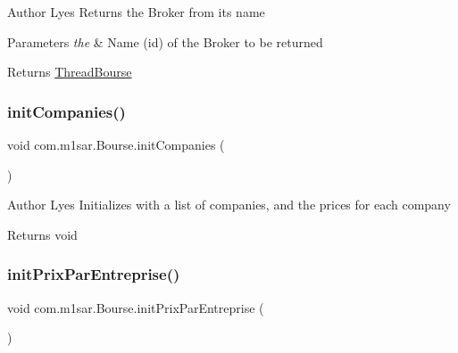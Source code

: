 \begin{DoxyAuthor}{Author}
Lyes Returns the Broker from its name 
\end{DoxyAuthor}

\begin{DoxyParams}{Parameters}
{\em the} & Name (id) of the Broker to be returned \\
\hline
\end{DoxyParams}
\begin{DoxyReturn}{Returns}
{\ttfamily \hyperlink{classcom_1_1m1sar_1_1_thread_bourse}{Thread\+Bourse}} 
\end{DoxyReturn}
\mbox{\label{classcom_1_1m1sar_1_1_bourse_a735c9da562fa5e84f2cc50cfed378bd9}} 
\subsubsection{\texorpdfstring{init\+Companies()}{initCompanies()}}
{\footnotesize\ttfamily void com.\+m1sar.\+Bourse.\+init\+Companies (\begin{DoxyParamCaption}{ }\end{DoxyParamCaption})}

\begin{DoxyAuthor}{Author}
Lyes Initializes with a list of companies, and the prices for each company 
\end{DoxyAuthor}
\begin{DoxyReturn}{Returns}
{\ttfamily void} 
\end{DoxyReturn}
\mbox{\label{classcom_1_1m1sar_1_1_bourse_ae4e655b8d10208ff6b9e73eb62767558}} 
\subsubsection{\texorpdfstring{init\+Prix\+Par\+Entreprise()}{initPrixParEntreprise()}}
{\footnotesize\ttfamily void com.\+m1sar.\+Bourse.\+init\+Prix\+Par\+Entreprise (\begin{DoxyParamCaption}{ }\end{DoxyParamCaption})}

